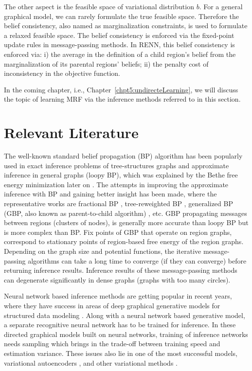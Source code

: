 The other aspect is the feasible space of variational distribution $b$. For a general graphical model, we can rarely formulate the true feasible space. Therefore the belief consistency, also named as marginalization constraints, is used to formulate a relaxed feasible space. The belief consistency is enforced via the fixed-point update rules in message-passing methods. In RENN, this belief consistency is enforced via: i) the average in the definition of a child region's belief from the marginalization of its parental regions' beliefs; ii) the penalty cost of inconsistency in the objective function. 

In the coming chapter, i.e., Chapter~\ref{chpt5:undirecteLearning}, we will discuss the topic of learning MRF via the inference methods referred to in this section.

\section{Relevant Literature}\label{chpt4:sec:literature}

The well-known standard belief propagation (BP) algorithm \cite{Pearl1982reverend,kschischang2001factor_graph} has been popularly used in exact inference problems of tree-structures graphs and approximate inference in general graphs (loopy BP), which was explained by the Bethe free energy minimization later on \cite{yedidia2003understanding}. The attempts in improving the approximate inference with BP and gaining better insight has been made, where the representative works are fractional BP \cite{Wiegerinck:2002:FBP:2968618.2968673}, tree-reweighted BP \cite{wainwright2008graphical}, generalized BP (GBP, also known as parent-to-child algorithm) \cite{Yedidia:2000:GBP:3008751.3008848, yedida2005constucting}, etc. 
GBP propagating messages between regions (clusters of nodes), is generally more accurate than loopy BP but is more complex than BP. Fix points of GBP that operate on region graphs, correspond to stationary points of region-based free energy of the region graphs. Depending on the graph size and potential functions, the iterative message-passing algorithms can take a long time to converge (if they can converge) before returning inference results. Inference results of these message-passing methods can degenerate significantly in dense graphs (graphs with too many circles).

Neural network based inference methods are getting popular in recent years, where they have success in areas of deep graphical generative models for structured data modeling \cite{qu2019gmnn, johansonNIPS2016_6379, li2018graphical}. Along with a neural network based generative model, a separate recognitive neural network has to be trained for inference. In these directed graphical models built on neural networks, training of inference networks needs sampling which brings in the trade-off between training speed and estimation variance. These issues also lie in one of the most successful models, variational autoencoders \cite{DBLP:journals/corr/KingmaW13,2017arXiv170104722M, 2017arXiv171101558T}, and other variational methods \cite{kuleshov2017neural_variational, dustin2017hierarchical, domke2019provable, hernandez-lobatob16}.


